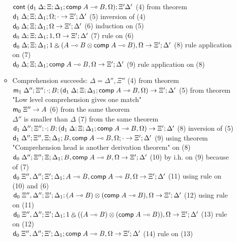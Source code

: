 \begin{itemize}
\begin{itemize}
$\mathsf{cont} \; (\mathsf{d}_1 \; \Delta; \Xi; \Delta_1; \mathsf{comp} \; A \multimap B, \Omega); \Xi' \Delta'$ \hfill (4) from theorem \\
$\mathsf{d}_1 \; \Delta; \Xi; \Delta_1; \Omega; \cdot \rightarrow \Xi'; \Delta'$ \hfill (5) inversion of (4) \\
$\mathsf{d}_0 \; \Delta; \Xi; \Delta_1; \Omega \rightarrow \Xi'; \Delta'$ \hfill (6) induction on (5) \\
$\mathsf{d}_0 \; \Delta; \Xi; \Delta_1; 1, \Omega \rightarrow \Xi';\Delta'$ \hfill (7) rule on (6) \\
$\mathsf{d}_0 \; \Delta; \Xi; \Delta_1; 1 \mathbin{\binampersand} (A \multimap B \otimes \mathsf{comp} \; A \multimap B), \Omega \rightarrow \Xi'; \Delta'$ \hfill (8) rule application on (7) \\
$\mathsf{d}_0 \; \Delta; \Xi; \Delta_1; \mathsf{comp} \; A \multimap B, \Omega \rightarrow \Xi'; \Delta'$ (9) rule application on (8) \\
\item Comprehension succeeds:
$\Delta = \Delta'', \Xi''$ \hfill (4) from theorem \\
$\mathsf{m}_1 \; \Delta''; \Xi''; \cdot ; B; (\mathsf{d}_1 \; \Delta; \Xi; \Delta_1; \mathsf{comp} \; A \multimap B, \Omega) \rightarrow \Xi'; \Delta'$ \hfill (5) from theorem "Low level comprehension gives one match" \\
$\mathsf{m}_0 \; \Xi'' \rightarrow A$ \hfill (6) from the same theorem \\
$\Delta''$ is smaller than $\Delta$ \hfill (7) from the same theorem \\
$\mathsf{d}_1 \; \Delta''; \Xi''; \cdot; B; (\mathsf{d}_1 \; \Delta; \Xi; \Delta_1; \mathsf{comp} \; A \multimap B, \Omega) \rightarrow \Xi'; \Delta'$ \hfill (8) inversion of (5) \\
$\mathsf{d}_1 \; \Delta''; \Xi'', \Xi; \Delta_1; B, \mathsf{comp} \; A \multimap B, \Omega; \cdot \rightarrow \Xi'; \Delta'$ \hfill (9) using theorem "Comprehension head is another derivation theorem" on (8) \\
$\mathsf{d}_0 \; \Delta''; \Xi''; \Xi; \Delta_1; B, \mathsf{comp} \; A \multimap B, \Omega \rightarrow \Xi'; \Delta'$ \hfill (10) by i.h. on (9) because of (7) \\
$\mathsf{d}_0 \; \Xi'', \Delta''; \Xi'; \Delta_1; A \multimap B, \mathsf{comp} \; A \multimap B, \Omega \rightarrow \Xi'; \Delta'$ \hfill (11) using rule on (10) and (6) \\
$\mathsf{d}_0 \; \Xi'', \Delta''; \Xi'; \Delta_1; (A \multimap B) \otimes (\mathsf{comp} \; A \multimap B), \Omega \rightarrow \Xi'; \Delta'$ \hfill (12) using rule on (11) \\
$\mathsf{d}_0 \; \Xi'', \Delta''; \Xi'; \Delta_1; 1 \mathbin{\binampersand} ((A \multimap B) \otimes (\mathsf{comp} \; A \multimap B)), \Omega \rightarrow \Xi'; \Delta'$ \hfill (13) rule on (12) \\
$\mathsf{d}_0 \; \Xi'', \Delta''; \Xi'; \Delta_1; \mathsf{comp} \; A \multimap B, \Omega \rightarrow \Xi'; \Delta'$ \hfill (14) rule on (13) \\

\end{itemize}
\end{itemize}


